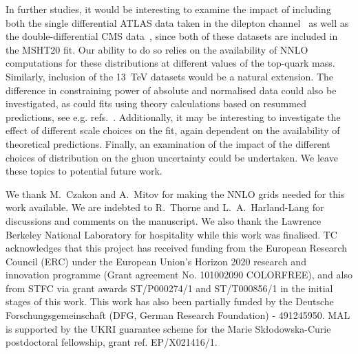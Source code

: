 \documentclass[sn-mathphys]{sn-jnl}%
\begin{document}
In further studies, it would be interesting to examine the impact of including both the single differential ATLAS data taken in the dilepton channel~\cite{ATLAS:2016pal} as well as the double-differential CMS data~\cite{CMS:2017iqf}, since both of these datasets are included in the MSHT20 fit. Our ability to do so relies on the availability of NNLO computations for these distributions at different values of the top-quark mass. Similarly, inclusion of the 13~TeV datasets would be a natural extension. The difference in constraining power of absolute and normalised data could also be investigated, as could fits using theory calculations based on resummed predictions, see e.g. refs.~\cite{Li:2013mia,Catani:2018mei,Alioli:2021ggd,Ju:2022wia}. Additionally, it may be interesting to investigate the effect of different scale choices on the fit, again dependent on the availability of theoretical predictions. Finally, an examination of the impact of the different choices of distribution on the gluon uncertainty could be undertaken. We leave these topics to potential future work.


\backmatter


We thank M.~Czakon and A.~Mitov for making the NNLO grids needed for this work available. We are indebted to R.~Thorne and L.~A.~Harland-Lang for discussions and comments on the manuscript. We also thank the Lawrence Berkeley National Laboratory for hospitality while this work was finalised. TC acknowledges that this project has received funding from the European Research Council (ERC) under the European Union’s Horizon 2020 research and innovation programme (Grant agreement No. 101002090 COLORFREE), and also from STFC via grant awards ST/P000274/1 and ST/T000856/1 in the initial stages of this work. This work has also been partially funded by the Deutsche Forschungsgemeinschaft (DFG, German Research Foundation) - 491245950. MAL is supported by the UKRI guarantee scheme for the Marie Sk\l{}odowska-Curie postdoctoral fellowship, grant ref. EP/X021416/1. 
\end{document}
